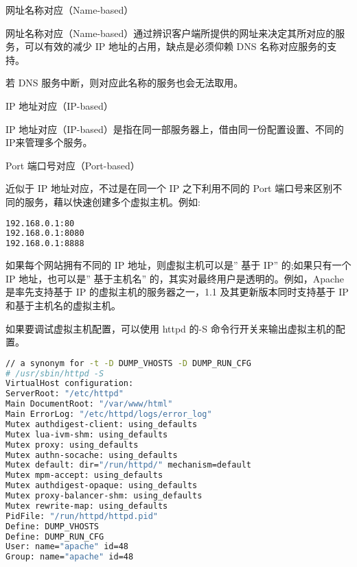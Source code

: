 \begin{compactitem}
\item 网址名称对应（Name-based）

网址名称对应（Name-based）通过辨识客户端所提供的网址来决定其所对应的服务，可以有效的减少 IP 地址的占用，缺点是必须仰赖 DNS 名称对应服务的支持。

若 DNS 服务中断，则对应此名称的服务也会无法取用。

\item IP 地址对应（IP-based）

IP 地址对应（IP-based）是指在同一部服务器上，借由同一份配置设置、不同的 IP来管理多个服务。

\item Port 端口号对应（Port-based）

近似于 IP 地址对应，不过是在同一个 IP 之下利用不同的 Port 端口号来区别不同的服务，藉以快速创建多个虚拟主机。例如:

\begin{lstlisting}[language=bash]
192.168.0.1:80
192.168.0.1:8080
192.168.0.1:8888
\end{lstlisting}

\end{compactitem}



如果每个网站拥有不同的 IP 地址，则虚拟主机可以是” 基于 IP” 的;如果只有一个IP 地址，也可以是” 基于主机名” 的，其实对最终用户是透明的。例如，Apache 是率先支持基于 IP 的虚拟主机的服务器之一，1.1 及其更新版本同时支持基于 IP 和基于主机名的虚拟主机。

如果要调试虚拟主机配置，可以使用 httpd 的-S 命令行开关来输出虚拟主机的配置。






\begin{lstlisting}[language=bash]
// a synonym for -t -D DUMP_VHOSTS -D DUMP_RUN_CFG
# /usr/sbin/httpd -S
VirtualHost configuration:
ServerRoot: "/etc/httpd"
Main DocumentRoot: "/var/www/html"
Main ErrorLog: "/etc/httpd/logs/error_log"
Mutex authdigest-client: using_defaults
Mutex lua-ivm-shm: using_defaults
Mutex proxy: using_defaults
Mutex authn-socache: using_defaults
Mutex default: dir="/run/httpd/" mechanism=default
Mutex mpm-accept: using_defaults
Mutex authdigest-opaque: using_defaults
Mutex proxy-balancer-shm: using_defaults
Mutex rewrite-map: using_defaults
PidFile: "/run/httpd/httpd.pid"
Define: DUMP_VHOSTS
Define: DUMP_RUN_CFG
User: name="apache" id=48
Group: name="apache" id=48
\end{lstlisting}


